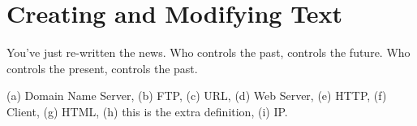 
\chapter{Creating and Modifying Text}

\begin{exercises}
\begin{ex}
You've just re-written the news. Who controls the past, controls the
future. Who controls the present, controls the past. 
\end{ex}

\begin{ex} %
(a) Domain Name Server,
(b) FTP,
(c) URL,
(d) Web Server,
(e) HTTP,
(f) Client,
(g) HTML,
(h) this is the extra definition,
(i) IP.
\end{ex}


\end{exercises}
